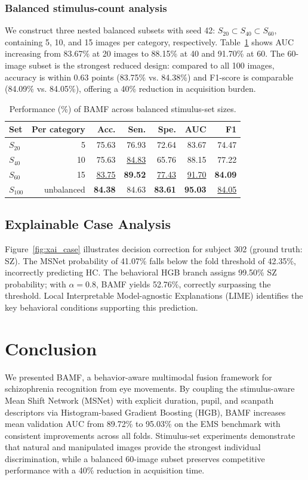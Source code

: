 \documentclass[conference,a4paper]{IEEEtran}
\begin{document}
\subsubsection{Balanced stimulus-count analysis}
We construct three nested balanced subsets with seed 42: $S_{20}\subset S_{40}\subset S_{60}$, containing 5, 10, and 15 images per category, respectively. Table~\ref{tab:stimulus_count} shows AUC increasing from 83.67\% at 20 images to 88.15\% at 40 and 91.70\% at 60. The 60-image subset is the strongest reduced design: compared to all 100 images, accuracy is within 0.63 points (83.75\% vs. 84.38\%) and F1-score is comparable (84.09\% vs. 84.05\%), offering a 40\% reduction in acquisition burden.

\begin{table}[t]
\caption{Performance (\%) of BAMF across balanced stimulus-set sizes.}
\label{tab:stimulus_count}
\centering
\small
\setlength{\tabcolsep}{5.2pt}
\begin{tabular}{lrrrrrr}
\toprule
Set & Per category & Acc. & Sen. & Spe. & AUC & F1 \\
\midrule
$S_{20}$ & 5 & 75.63 & 76.93 & 72.64 & 83.67 & 74.47 \\
$S_{40}$ & 10 & 75.63 & \underline{84.83} & 65.76 & 88.15 & 77.22 \\
$S_{60}$ & 15 & \underline{83.75} & \textbf{89.52} & \underline{77.43} & \underline{91.70} & \textbf{84.09} \\
$S_{100}$ & unbalanced & \textbf{84.38} & 84.63 & \textbf{83.61} & \textbf{95.03} & \underline{84.05} \\
\bottomrule
\end{tabular}
\end{table}

\subsection{Explainable Case Analysis}
Figure~\ref{fig:xai_case} illustrates decision correction for subject 302 (ground truth: SZ). The MSNet probability of 41.07\% falls below the fold threshold of 42.35\%, incorrectly predicting HC. The behavioral HGB branch assigns 99.50\% SZ probability; with $\alpha=0.8$, BAMF yields 52.76\%, correctly surpassing the threshold. Local Interpretable Model-agnostic Explanations (LIME) identifies the key behavioral conditions supporting this prediction.

\section{Conclusion}
We presented BAMF, a behavior-aware multimodal fusion framework for schizophrenia recognition from eye movements. By coupling the stimulus-aware Mean Shift Network (MSNet) with explicit duration, pupil, and scanpath descriptors via Histogram-based Gradient Boosting (HGB), BAMF increases mean validation AUC from 89.72\% to 95.03\% on the EMS benchmark with consistent improvements across all folds. Stimulus-set experiments demonstrate that natural and manipulated images provide the strongest individual discrimination, while a balanced 60-image subset preserves competitive performance with a 40\% reduction in acquisition time.



\end{document}

